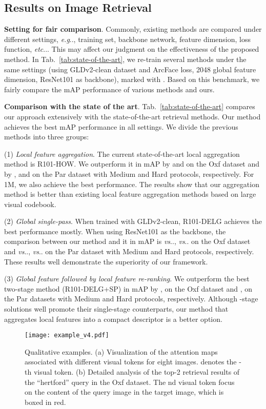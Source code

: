 \documentclass[letterpaper]{article} \usepackage{aaai22}  \usepackage{times}  \usepackage{helvet}  \usepackage{courier}  \usepackage[hyphens]{url}  \usepackage{graphicx} \urlstyle{rm} \def\UrlFont{\rm}  \usepackage{natbib}  \usepackage{caption} \DeclareCaptionStyle{ruled}{labelfont=normalfont,labelsep=colon,strut=off} \frenchspacing  \setlength{\pdfpagewidth}{8.5in}  \setlength{\pdfpageheight}{11in}  \usepackage{algorithm}
\makeatletter
\DeclareRobustCommand\onedot{\futurelet\@let@token\@onedot}
\def\@onedot{\ifx\@let@token.\else.\null\fi\xspace}
\def\eg{\emph{e.g}\onedot} \def\Eg{\emph{E.g}\onedot}
\def\etc{\emph{etc}\onedot} \def\vs{\emph{vs}\onedot}
\makeatother
\begin{document}
\subsection{Results on Image Retrieval}
\noindent\textbf{Setting for fair comparison}.
Commonly, existing methods are compared under different settings, 
\eg, training set, backbone network, feature dimension, loss function, \etc. 
This may affect our judgment on the effectiveness of the proposed method. 
In Tab.~\ref{tab:state-of-the-art}, we re-train several methods under the same settings (using GLDv2-clean dataset and ArcFace loss, 2048 global feature dimension, ResNet101 as backbone), marked with . 
Based on this benchmark, we fairly compare the mAP performance of various methods and ours.

\noindent\textbf{Comparison with the state of the art}. Tab.~\ref{tab:state-of-the-art} compares our approach extensively with the state-of-the-art retrieval methods.
Our method achieves the best mAP performance in all settings.
We divide the previous methods into three groups: 

\noindent(1) \textit{Local feature aggregation}. 
The current state-of-the-art local aggregation method is R101-HOW. 
We outperform it in mAP by  and  on the Oxf dataset and by , and  on the Par dataset with Medium and Hard protocols, respectively. 
For 1M, we also achieve the best performance.
The results show that our aggregation method is better than existing local feature aggregation methods based on large visual codebook.

\noindent(2) \textit{Global single-pass}. 
When trained with GLDv2-clean, R101-DELG achieves the best performance mostly.
When using ResNet101 as the backbone, the comparison between our method and it in mAP is 
 \vs ,  \vs  on the Oxf dataset and
 \vs ,  \vs  on the Par dataset with Medium and Hard protocols, respectively.
These results well demonstrate the superiority
of our framework.

\noindent(3) \textit{Global feature followed by local feature re-ranking}. 
We outperform the best two-stage method (R101-DELG+SP) in mAP by ,  on the Oxf dataset and ,  on the Par datasets with Medium and Hard protocols, respectively.
Although -stage solutions well promote their single-stage counterparts, 
our method that aggregates local features into a compact descriptor is a better option.

\begin{figure}[t]
	\begin{center}
		\texttt{[image: example\_v4.pdf]}
	\end{center}
	\caption{Qualitative examples. 
		(a) Visualization of the attention maps associated with different visual tokens for eight images.  denotes the -th visual token.
		(b) Detailed analysis of the top-2 retrieval results of the ``hertford'' query in the Oxf dataset. The nd visual token focus on the content of the query image in the target image, 
		which is boxed in red.
	}
	\label{fig:attn} 
\end{figure}
\end{document}
